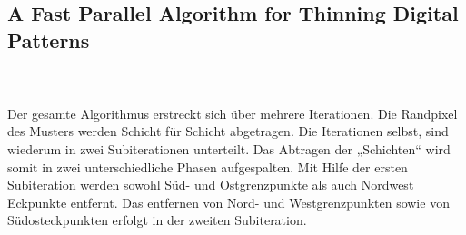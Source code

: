 \subsection{A Fast Parallel Algorithm for Thinning Digital Patterns} 
\\\\
\label{subsec:fastparallel}
Der gesamte Algorithmus erstreckt sich über mehrere Iterationen. Die Randpixel des Musters werden Schicht für Schicht abgetragen. Die Iterationen selbst, sind wiederum in zwei Subiterationen unterteilt. Das Abtragen der „Schichten“ wird somit in zwei unterschiedliche Phasen aufgespalten.
Mit Hilfe der ersten Subiteration werden sowohl Süd- und Ostgrenzpunkte als auch Nordwest Eckpunkte entfernt. Das entfernen von Nord- und Westgrenzpunkten sowie von Südosteckpunkten erfolgt in der zweiten Subiteration.
